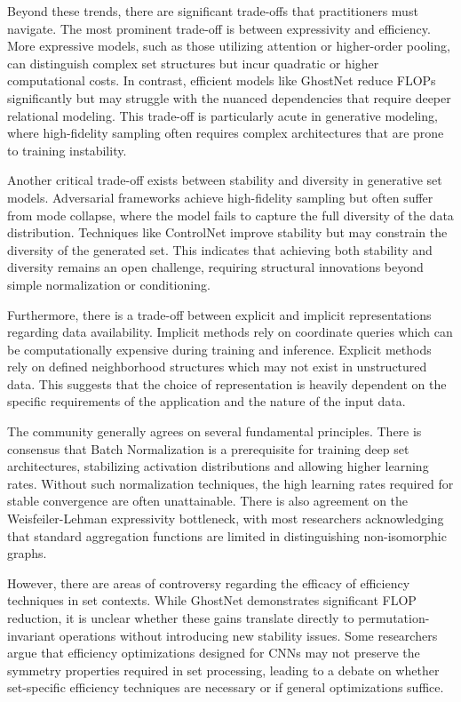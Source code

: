 \documentclass{article}
\begin{document}
Beyond these trends, there are significant trade-offs that practitioners must navigate. The most prominent trade-off is between expressivity and efficiency. More expressive models, such as those utilizing attention or higher-order pooling, can distinguish complex set structures but incur quadratic or higher computational costs. In contrast, efficient models like GhostNet reduce FLOPs significantly but may struggle with the nuanced dependencies that require deeper relational modeling. This trade-off is particularly acute in generative modeling, where high-fidelity sampling often requires complex architectures that are prone to training instability.

Another critical trade-off exists between stability and diversity in generative set models. Adversarial frameworks achieve high-fidelity sampling but often suffer from mode collapse, where the model fails to capture the full diversity of the data distribution. Techniques like ControlNet improve stability but may constrain the diversity of the generated set. This indicates that achieving both stability and diversity remains an open challenge, requiring structural innovations beyond simple normalization or conditioning.

Furthermore, there is a trade-off between explicit and implicit representations regarding data availability. Implicit methods rely on coordinate queries which can be computationally expensive during training and inference. Explicit methods rely on defined neighborhood structures which may not exist in unstructured data. This suggests that the choice of representation is heavily dependent on the specific requirements of the application and the nature of the input data.

The community generally agrees on several fundamental principles. There is consensus that Batch Normalization is a prerequisite for training deep set architectures, stabilizing activation distributions and allowing higher learning rates. Without such normalization techniques, the high learning rates required for stable convergence are often unattainable. There is also agreement on the Weisfeiler-Lehman expressivity bottleneck, with most researchers acknowledging that standard aggregation functions are limited in distinguishing non-isomorphic graphs.

However, there are areas of controversy regarding the efficacy of efficiency techniques in set contexts. While GhostNet demonstrates significant FLOP reduction, it is unclear whether these gains translate directly to permutation-invariant operations without introducing new stability issues. Some researchers argue that efficiency optimizations designed for CNNs may not preserve the symmetry properties required in set processing, leading to a debate on whether set-specific efficiency techniques are necessary or if general optimizations suffice.
\end{document}
